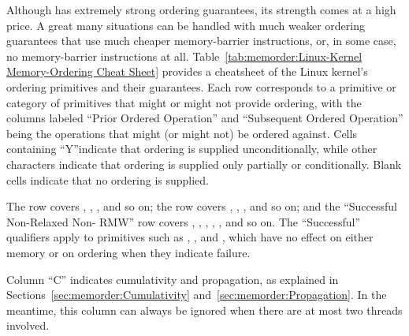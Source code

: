 Although  has extremely strong ordering guarantees, its strength
comes at a high price.
A great many situations can be handled with much weaker ordering guarantees
that use much cheaper memory-barrier instructions, or, in some case, no
memory-barrier instructions at all.
Table~\ref{tab:memorder:Linux-Kernel Memory-Ordering Cheat Sheet}
provides a cheatsheet of the Linux kernel's ordering primitives and their
guarantees.
Each row corresponds to a primitive or category of primitives that might
or might not provide ordering, with the columns labeled
``Prior Ordered Operation'' and ``Subsequent Ordered Operation''
being the operations that might (or might not) be ordered against.
Cells containing ``Y''indicate that ordering is supplied unconditionally,
while other characters indicate that ordering is supplied only partially or
conditionally.
Blank cells indicate that no ordering is supplied.

The  row covers ,
, , and so on;
the  row covers ,
, , and so on; and
the ``Successful Non-Relaxed Non- RMW'' row covers
, , ,
, , and so on.
The ``Successful'' qualifiers apply to primitives such as
, , and ,
which have no effect on either memory or on ordering when they indicate
failure.

Column ``C'' indicates cumulativity and propagation, as explained in
Sections~\ref{sec:memorder:Cumulativity}
and~\ref{sec:memorder:Propagation}.
In the meantime, this column can always be ignored when there
are at most two threads involved.

